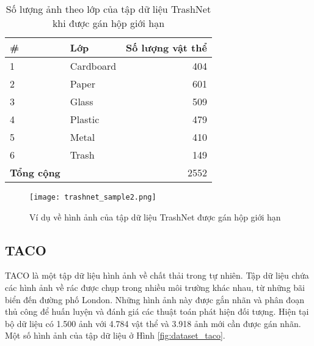 \documentclass[../the.tex]{subfiles}
\begin{document}
\begin{table}[!ht]
	\centering
	\begin{threeparttable}
		\caption{Số lượng ảnh theo lớp của tập dữ liệu TrashNet khi được gán hộp giới hạn}

		\begin{tabular}{llr}
			\hline
			\multicolumn{1}{l}{
				\textbf{\#}}
			 & \multicolumn{1}{l}{\textbf{Lớp}}
			 & \multicolumn{1}{r}{\textbf{Số lượng vật thể}} \\
			\hline

			1
			 & Cardboard
			 & 404                                           \\
			\hline

			2
			 & Paper
			 & 601                                           \\
			\hline

			3
			 & Glass
			 & 509                                           \\
			\hline

			4
			 & Plastic
			 & 479                                           \\
			\hline

			5
			 & Metal
			 & 410                                           \\
			\hline

			6
			 & Trash
			 & 149                                           \\
			\hline


			\textbf{Tổng cộng}
			 &
			 & 2552                                          \\
			\hline
		\end{tabular}
	\label{tab:dataset1}
	\end{threeparttable}
\end{table}

\begin{figure}[H]
	\centering
	\texttt{[image: trashnet\_sample2.png]}
	\caption{Ví dụ về hình ảnh của tập dữ liệu TrashNet được gán hộp giới hạn}
	\label{fig:dataset_1}
\end{figure}

\subsection{TACO}
\label{sec:TACO}
{\fontsize{13}{12} \selectfont

	TACO là một tập dữ liệu hình ảnh về chất thải trong tự nhiên. Tập dữ liệu chứa các hình ảnh về rác được chụp trong nhiều môi trường khác nhau, từ những bãi biển đến đường phố London. Những hình ảnh này được gắn nhãn và phân đoạn thủ công để huấn luyện và đánh giá các thuật toán phát hiện đối tượng.
	Hiện tại bộ dữ liệu có 1.500 ảnh với 4.784 vật thể
	và 3.918 ảnh mới cần được gán nhãn. Một số hình ảnh của tập dữ liệu ở Hình \ref{fig:dataset_taco}.

}
\end{document}

